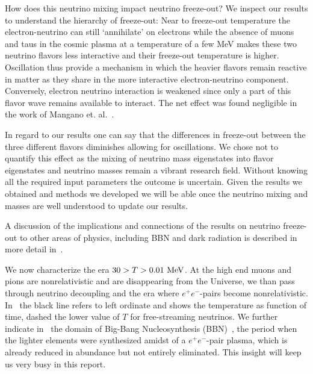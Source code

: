 How does this neutrino mixing impact neutrino freeze-out? We inspect our results to understand the hierarchy of freeze-out: Near to freeze-out temperature the electron-neutrino can still `annihilate' on electrons while the absence of muons and taus in the cosmic plasma at a temperature of a few MeV makes these two neutrino flavors less interactive and their freeze-out temperature is higher. Oscillation thus provide a mechanism in which the heavier flavors remain reactive in matter as they share in the more interactive electron-neutrino component. Conversely, electron neutrino interaction is weakened since only a part of this flavor wave remains available to interact. The net effect was found negligible in the work of Mangano et. al.~\cite{Mangano:2005cc}. 

In regard to our results one can say that the differences in freeze-out between the three different flavors diminishes allowing for oscillations. We chose not to quantify this effect as the mixing of neutrino mass eigenstates into flavor eigenstates and neutrino masses remain a vibrant research field. Without knowing all the required input parameters the outcome is uncertain. Given the results we obtained and methods we developed we will be able once the neutrino mixing and masses are well understood to update our results. 

A discussion of the implications and connections of the results on neutrino freeze-out to other areas of physics, including BBN and dark radiation is described in more detail in~\cite{Dreiner:2011fp,Boehm:2012gr,Blennow:2012de,Birrell:2014uka}. 

We now characterize the era $30>T>0.01\text{ MeV}$. At the high end muons and pions are nonrelativistic and are disappearing from the Universe, we than pass through neutrino decoupling and the era where $e^+e^-$-pairs become nonrelativistic. In~ the black line refers to left ordinate and shows the temperature as function of time, dashed the lower value of $T$ for free-streaming neutrinos. We further indicate in~ the domain of Big-Bang Nucleosynthesis (BBN)~\cite{Iocco:2008va}, the period when the lighter elements were synthesized amidst of a $e^+e^-$-pair plasma, which is already reduced in abundance but not entirely eliminated. This insight will keep us very busy in this report. 


